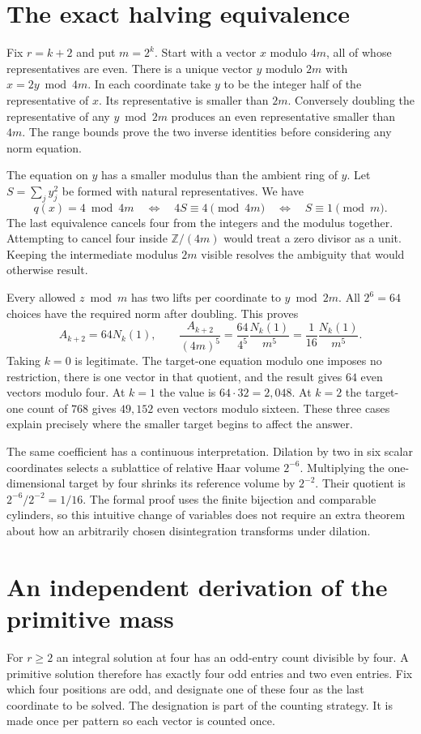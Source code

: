 \documentclass[12pt,letterpaper]{article}
\begin{document}
\section{The exact halving equivalence}
Fix $r=k+2$ and put $m=2^k$. Start with a vector $x$ modulo $4m$, all of whose representatives are even. There is a unique vector $y$ modulo $2m$ with $x=2y\bmod 4m$. In each coordinate take $y$ to be the integer half of the representative of $x$. Its representative is smaller than $2m$. Conversely doubling the representative of any $y\bmod 2m$ produces an even representative smaller than $4m$. The range bounds prove the two inverse identities before considering any norm equation.

The equation on $y$ has a smaller modulus than the ambient ring of $y$. Let $S=\sum_j y_j^2$ be formed with natural representatives. We have
\[
 q(x)=4\bmod 4m\quad\Longleftrightarrow\quad
 4S\equiv4\pmod{4m}\quad\Longleftrightarrow\quad S\equiv1\pmod m .
\]
The last equivalence cancels four from the integers and the modulus together. Attempting to cancel four inside $\mathbb Z/(4m)$ would treat a zero divisor as a unit. Keeping the intermediate modulus $2m$ visible resolves the ambiguity that would otherwise result.

Every allowed $z\bmod m$ has two lifts per coordinate to $y\bmod 2m$. All $2^6=64$ choices have the required norm after doubling. This proves
\[
 A_{k+2}=64N_k(1),\qquad
 \frac{A_{k+2}}{(4m)^5}=\frac{64}{4^5}\frac{N_k(1)}{m^5}
                         =\frac1{16}\frac{N_k(1)}{m^5}.
\]
Taking $k=0$ is legitimate. The target-one equation modulo one imposes no restriction, there is one vector in that quotient, and the result gives $64$ even vectors modulo four. At $k=1$ the value is $64\cdot32=2,048$. At $k=2$ the target-one count of $768$ gives $49,152$ even vectors modulo sixteen. These three cases explain precisely where the smaller target begins to affect the answer.

The same coefficient has a continuous interpretation. Dilation by two in six scalar coordinates selects a sublattice of relative Haar volume $2^{-6}$. Multiplying the one-dimensional target by four shrinks its reference volume by $2^{-2}$. Their quotient is $2^{-6}/2^{-2}=1/16$. The formal proof uses the finite bijection and comparable cylinders, so this intuitive change of variables does not require an extra theorem about how an arbitrarily chosen disintegration transforms under dilation.

\section{An independent derivation of the primitive mass}
For $r\ge2$ an integral solution at four has an odd-entry count divisible by four. A primitive solution therefore has exactly four odd entries and two even entries. Fix which four positions are odd, and designate one of these four as the last coordinate to be solved. The designation is part of the counting strategy. It is made once per pattern so each vector is counted once.
\end{document}
